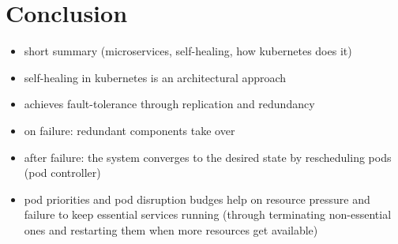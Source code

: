 \section{Conclusion}
  \begin{itemize}
    \item short summary (microservices, self-healing, how \gls{kubernetes} does it)
    \item self-healing in \gls{kubernetes} is an architectural approach
    \item achieves fault-tolerance through replication and redundancy
    \item on failure: redundant components take over
    \item after failure: the system converges to the desired state by rescheduling pods (pod controller)
    \item pod priorities and pod disruption budges help on resource pressure and failure to keep essential services running (through terminating non-essential ones and restarting them when more resources get available)
  \end{itemize}